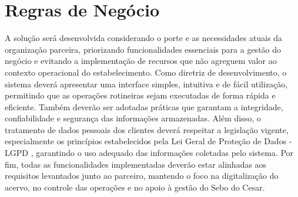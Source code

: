 \section{Regras de Negócio}
A solução será desenvolvida considerando o porte e as necessidades atuais da organização parceira, priorizando funcionalidades essenciais para a gestão do negócio e evitando a implementação de recursos que não agreguem valor ao contexto operacional do estabelecimento. Como diretriz de desenvolvimento, o sistema deverá apresentar uma interface simples, intuitiva e de fácil utilização, permitindo que as operações rotineiras sejam executadas de forma rápida e eficiente. Também deverão ser adotadas práticas que garantam a integridade, confiabilidade e segurança das informações armazenadas.
Além disso, o tratamento de dados pessoais dos clientes deverá respeitar a legislação vigente, especialmente os princípios estabelecidos pela Lei Geral de Proteção de Dados - LGPD \cite{brasil2018lgpd}, garantindo o uso adequado das informações coletadas pelo sistema. Por fim, todas as funcionalidades implementadas deverão estar alinhadas aos requisitos levantados junto ao parceiro, mantendo o foco na digitalização do acervo, no controle das operações e no apoio à gestão do Sebo do Cesar.
